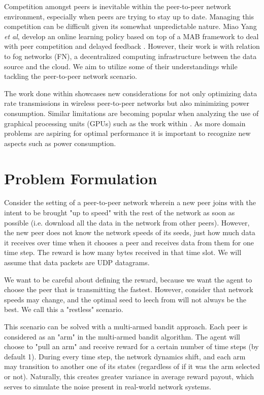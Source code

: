 \documentclass{article}
\begin{document}
Competition amongst peers is inevitable within the peer-to-peer network environment, especially when peers are trying to stay up to date. Managing this competition can be 
difficult given its somewhat unpredictable nature. Miao Yang \textit{et al}, develop an online learning policy based on top of a MAB framework to deal with peer competition 
and delayed feedback \cite{p2p_offloading_with_delayed_feedback}. However, their work is with relation to fog networks (FN), a decentralized computing infrastructure between 
the data source and the cloud. We aim to utilize some of their understandings while tackling the peer-to-peer network scenario. 

The work done within \cite{p2p_net_sender_scheduling} showcases new considerations for not only optimizing data rate transmissions in wireless peer-to-peer networks but also 
minimizing power consumption. Similar limitations are becoming popular when analyzing the use of graphical processing units (GPUs) such as the work within \cite{gpu_eng}. As 
more domain problems are aspiring for optimal performance it is important to recognize new aspects such as power consumption. 



\section{Problem Formulation}

Consider the setting of a peer-to-peer network wherein a new peer joins with the intent to be brought "up to speed" with the rest of the network as soon as 
possible (i.e. download all the data in the network from other peers). However, the new peer does not know the network speeds of its seeds, just how much data 
it receives over time when it chooses a peer and receives data from them for one time step. The reward is how many bytes received in that time slot. We will 
assume that data packets are UDP datagrams.

We want to be careful about defining the reward, because we want the agent to choose the peer that is transmitting the fastest. However, consider that network 
speeds may change, and the optimal seed to leech from will not always be the best. We call this a "restless" scenario.

This scenario can be solved with a multi-armed bandit approach. Each peer is considered as an "arm" in the multi-armed bandit algorithm. The agent will choose to 
"pull an arm" and receive reward for a certain number of time steps (by default 1). During every time step, the network dynamics shift, and each arm may transition 
to another one of its states (regardless of if it was the arm selected or not). Naturally, this creates greater variance in average reward payout, which serves to 
simulate the noise present in real-world network systems. 
\end{document}
